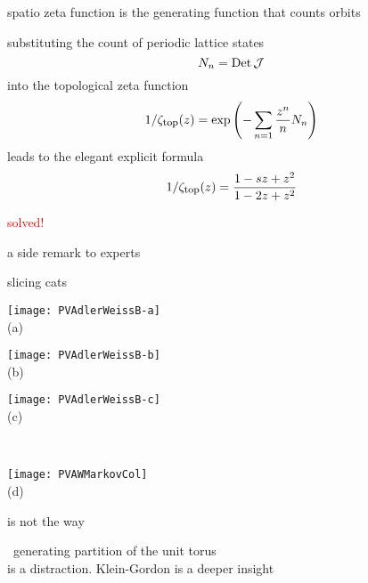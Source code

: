 \begin{frame}{{\color{orange}spatio}{\templatt}  zeta function}
is the generating function that counts {\color{blue}orbits}
\medskip

substituting the {\color{blue}\HillDet} count of periodic lattice states
\[
N_n = \mbox{\rm Det}\,{\cal J}
\]
into the
{topological} zeta func\-tion
\[
1/\zeta_{\mbox{\footnotesize top}} (z)
  =   \exp \left(
    -\sum_{n=1} \frac{z^n}{n} N_n
    \right)
\]%
leads to the elegant explicit formula
\[
1/\zeta_{\mbox{\footnotesize top}} (z)
 =  \frac{1 - s z + z^2}
         {1 - 2z + z^2}
\]%


\vfill\hfill
{\Huge \textcolor{red}{solved!}}
\end{frame} %

\begin{frame}{a side remark to experts}
    \begin{block}{slicing cats}
\begin{center}
            \begin{minipage}[c]{0.23\textwidth}\begin{center}
\texttt{[image: PVAdlerWeissB-a]}\\(a)
            \end{center}\end{minipage}
            \begin{minipage}[c]{0.23\textwidth}\begin{center}
\texttt{[image: PVAdlerWeissB-b]}\\(b)
            \end{center}\end{minipage}
            \begin{minipage}[c]{0.23\textwidth}\begin{center}
\texttt{[image: PVAdlerWeissB-c]}\\(c)
            \end{center}\end{minipage}
            ~~~
            \begin{minipage}[c]{0.12\textwidth}\begin{center}
\texttt{[image: PVAWMarkovCol]}\\(d)
            \end{center}\end{minipage}
\end{center}

 is not the way
    \end{block}

\AW\ generating partition of the unit torus\\
is a distraction. Klein-Gordon is a deeper insight
\end{frame} %

